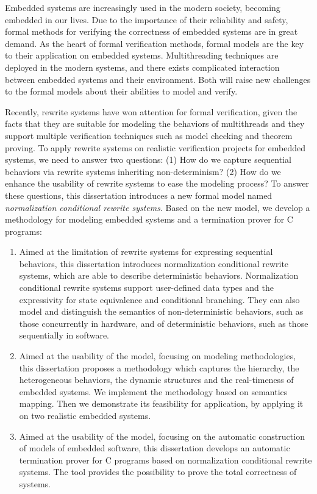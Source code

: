 \begin{eabstract}

Embedded systems are increasingly used in the modern society, becoming 
embedded in our lives. Due to the importance of their reliability and safety, 
formal methods for verifying the correctness of embedded systems are in great demand. As the heart of formal verification methods, formal models are the key to their application on embedded systems. Multithreading techniques are deployed in the modern systems, and there exists complicated interaction between embedded systems and their environment. Both will raise new challenges to the formal models about their abilities to model and verify.

Recently, rewrite systems have won attention for formal verification, given the facts that they are suitable for modeling the behaviors of multithreads and they support multiple verification techniques such as model checking and theorem proving. To apply rewrite systems on realistic verification projects for embedded systems, we need to answer two questions: (1) How do we capture sequential behaviors via rewrite systems inheriting non-determinism? (2) How do we enhance the usability of rewrite systems to ease the modeling process? To answer these questions, this dissertation introduces a new formal model named \emph{normalization conditional rewrite systems}. Based on the new model, we develop a methodology for modeling embedded systems and a termination prover \CTerm\xspace for C programs: 

\begin{enumerate} 
\item Aimed at the limitation of rewrite systems for expressing sequential behaviors, this dissertation introduces normalization conditional rewrite systems, which are able to describe deterministic behaviors. Normalization conditional rewrite systems support user-defined data types and the expressivity for state equivalence and conditional branching. They can also model and distinguish the semantics of non-deterministic behaviors, such as those concurrently in hardware, and of deterministic behaviors, such as those sequentially in software. 
\item Aimed at the usability of the model, focusing on modeling methodologies, this dissertation proposes a methodology which captures the hierarchy, the heterogeneous behaviors, the dynamic structures and the real-timeness of embedded systems. We implement the methodology based on semantics mapping. Then we demonstrate its feasibility for application, by applying it on two realistic embedded systems. 
\item Aimed at the usability of the model, focusing on the automatic construction of models of embedded software, this dissertation develops an automatic termination prover \CTerm\xspace for C programs based on normalization conditional rewrite systems. The tool provides the possibility to prove the total correctness of systems. 
\end{enumerate}

\end{eabstract}

